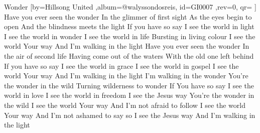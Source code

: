 \beginsong
{Wonder %
}[by={Hillsong United  %
},album={@walyssondosreis},
id={GI0007 %
},rev={0}, %
qr={ %
}]
\beginverse
Have you ever seen the wonder
In the glimmer of first sight
As the eyes begin to open
And the blindness meets the light
If you have so say
\endverse
\beginchorus
I see the world in light
I see the world in wonder
I see the world in life
Bursting in living colour
I see the world Your way
And I'm walking in the light
\endchorus
\beginverse
Have you ever seen the wonder
In the air of second life
Having come out of the waters
With the old one left behind
If you have so say
\endverse
\beginverse
I see the world in grace
I see the world in gospel
I see the world Your way
And I'm walking in the light
I'm walking in the wonder
You're the wonder in the wild
Turning wilderness to wonder
If You have so say
I see the world in love
I see the world in freedom
I see the Jesus way
You're the wonder in the wild
\endverse
\beginverse
I see the world Your way
And I'm not afraid to follow
I see the world Your way
And I'm not ashamed to say so
I see the Jesus way
And I'm walking in the light
\endverse


